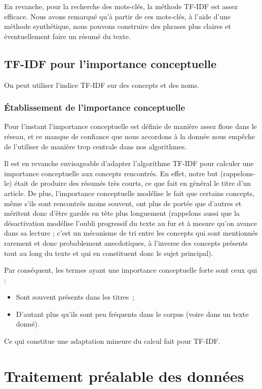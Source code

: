 \documentclass[a4paper, 12pt]{article}
\begin{document}
En revanche, pour la recherche des mots-clés, la méthode TF-IDF est assez efficace. Nous avons remarqué qu'à partir de ces mots-clés, à l'aide d'une méthode synthétique, nous pouvons construire des phrases plus claires et éventuellement faire un résumé du texte.

\subsection{TF-IDF pour l'importance conceptuelle}
On peut utiliser l'indice TF-IDF sur des concepts et des noms.


\subsubsection{Établissement de l'importance conceptuelle}

Pour l'instant l'importance conceptuelle est définie de manière assez floue dans le réseau, et ce manque de confiance que nous accordons à la donnée nous empêche de l'utiliser de manière trop centrale dans nos algorithmes.

Il est en revanche envisageable d'adapter l'algorithme TF-IDF pour calculer une importance conceptuelle aux concepts rencontrés. En effet, notre but (rappelons-le) était de produire des résumés très courts, ce que fait en général le titre d'un article. De plus, l'importance conceptuelle modélise le fait que certains concepts, même s'ils sont rencontrés moins souvent, ont plus de portée que d'autres et méritent donc d'être gardés en tête plus longuement (rappelons aussi que la désactivation modélise l'oubli progressif du texte au fur et à mesure qu'on avance dans sa lecture ; c'est un mécanisme de tri entre les concepts qui sont mentionnés rarement et donc probablement anecdotiques, à l'inverse des concepts présents tout au long du texte et qui en constituent donc le sujet principal).

Par conséquent, les termes ayant une importance conceptuelle forte sont ceux qui :
\begin{itemize}
	\item Sont souvent présents dans les titres~;
	\item D'autant plus qu'ils sont peu fréquents dans le corpus (voire dans un texte donné).
\end{itemize}
Ce qui constitue une adaptation mineure du calcul fait pour TF-IDF.


\section{Traitement préalable des données}
\end{document}
